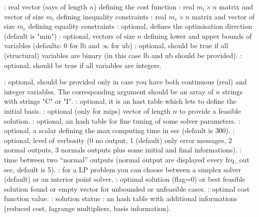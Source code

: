 \begin{parameters}
  \begin{varlist}
    : real vector (says of length $n$) defining the cost function
    : real $m_i \times n$ matrix and vector of size $m_i$ defining inequality constraints
    : real $m_e \times n$ matrix and vector  of size $m_e$ defining equality constraints
    : optional, defines the optimisation direction (default is "min")
    : optional, vectors of size $n$ defining lower and upper bounds of 
                      variables (defaults: $0$ for lb and $\infty$ for ub)
    : optional, should be true if all (structural) variables are binary (in this case
                      lb and ub should be provided).
    : optional,  should be true if all variables are integers.
    
    : optional, should be provided only in case you have both continuous (real) 
                       and integer variables. The corresponding argument should be an array of
                       $n$ strings with strings "C" or  "I".
    : optional, it is an hast table which lets to define the initial basis.
    : optional (only for mips) vector of length $n$ to provide a feasible solution.
    : optional, an hash table for fine tuning of some solver parameters.
    : optional, a scalar defining the max computing time in sec (default is 300).
    : optional, level of verbosity (0 no output, 1 (default) only error messages,
                   2 normal outputs, 3 normals outputs plus some initial and final informations).
    : time between two ``normal'' outputs (normal output are displayed every
                     frq\_out sec, default is 5).
    : for a LP problem you can choose between a simplex solver (default) or an 
                     interior point solver.
    : optimal solution (flag=0) or best feasible solution found or empty vector
                  for unbounded or unfeasible cases.
    : optimal cost function value.
    : solution status
    : an hash table with additional informations (reduced cost, lagrange
                    multipliers, basis information).
  \end{varlist}
\end{parameters}

